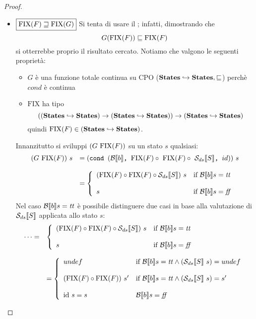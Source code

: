 {\begin{proof}
\begin{itemize}
	\item $\boxed{\textrm{\normalfont{FIX}}(F) \sqsupseteq \textrm{\normalfont{FIX}}(G)}$
	Si tenta di usare il \FPIL; infatti, dimostrando che
	$$
	G(\textrm{\normalfont{FIX}}(F)) \sqsubseteq \textrm{\normalfont{FIX}}(F)
	$$
	si otterrebbe proprio il risultato cercato.
        Notiamo che valgono le seguenti proprietà:
        \begin{itemize}
         \item $G$ è una funzione totale continua su CPO 
          ($\mbox{\textbf{States}} \hookrightarrow \mbox{\textbf{States}}, \sqsubseteq$) perchè $cond$ 
          è continua
         \item $\text{FIX}$ ha tipo
          $$
          ((\mbox{\textbf{States}} \hookrightarrow \mbox{\textbf{States}}) \rightarrow 
          (\mbox{\textbf{States}} \hookrightarrow \mbox{\textbf{States}})) \rightarrow
          (\mbox{\textbf{States}} \hookrightarrow \mbox{\textbf{States}})
          $$ 
          quindi $\textrm{\normalfont{FIX}}(F) \in 
          (\mbox{\textbf{States}} \hookrightarrow \mbox{\textbf{States}})$.
        \end{itemize}
        Innanzitutto si sviluppi $(G\ \fixp{F})$ su un stato $s$ qualsiasi:
        $$
        \begin{array}{ll}
          (G \ \textrm{\normalfont{FIX}}(F))\ s & = (\mbox{\normalfont{\texttt{cond }}} (\mathcal{B}{}\llbracket b \rrbracket \textrm{\normalfont{\texttt{, }}} \textrm{\normalfont{FIX}}(F) \circ\  \textrm{\normalfont{FIX}}(F) \circ \
          \mathcal{S}_{ds}\llbracket S \rrbracket \textrm{\normalfont{\texttt{, }}} id))\ s \\
          & \\
          & = \left\lbrace \begin{array}{ll} (\textrm{\normalfont{FIX}}(F) \circ{} \textrm{\normalfont{FIX}}(F) \circ{} \mathcal{S}_{ds}\llbracket S \rrbracket)\ s & \mbox{if } \mathcal{B} \llbracket b \rrbracket s =
          \mbox{\textit{tt}} \\ & \\ s & \mbox{if } \mathcal{B} \llbracket b \rrbracket s = \mbox{\textit{ff}} \\ \end{array} \right. 
        \end{array}
        $$
        Nel caso $\mathcal{B} \llbracket b \rrbracket s = \mbox{\textit{tt}}$ è possibile distinguere due casi in base
        alla valutazione di $\mathcal{S}_{ds}\llbracket S \rrbracket$ applicata allo stato $s$:
        $$
        \begin{array}{ll}
        \dots = 
        & \caseFun{(\fixp{F} \circ \fixp{F} \circ \dsCtxt{S})\ s}{\B{b} =
          \semtrue}{s}{\B{b} = \semfalse}  \\
        \\
        & = \left\lbrace 
          \begin{array}{ll}
            undef & \mbox{if } \B{b} = \semtrue \land (\dsCtxt{S}\  s) = undef  \\
            &  \\                  
            (\fixp{F} \circ \fixp{F})\ s' & \mbox{if } \B{b} = \semtrue \land (\dsCtxt{S}\ s) = s'  \\
                  & \\
            \idDS\ s = s & \B{b} = \semfalse\\
          \end{array}
          \right. \\
        \end{array}
        $$


\end{itemize}
\end{proof}}
